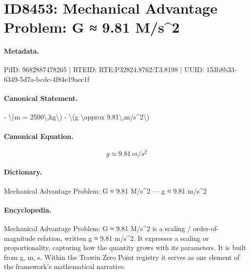 \section*{ID8453: Mechanical Advantage Problem: G ≈ 9.81 M/s\textasciicircum{}2}
\paragraph{Metadata.}
PiID: 9682887478265 | RTEID: RTE:P32824.8762:T3.8198 | UUID: 153b8b33-6349-5d7a-bcdc-4f84e19aec1f

\paragraph{Canonical Statement.}
- \textbackslash{}(m = 2500\textbackslash{},kg\textbackslash{}) - \textbackslash{}(g \textbackslash{}approx 9.81\textbackslash{},m/s\textasciicircum{}2\textbackslash{})

\paragraph{Canonical Equation.}
\[
g \approx 9.81\,m/s^2
\]

\paragraph{Dictionary.}
Mechanical Advantage Problem: G ≈ 9.81 M/s\textasciicircum{}2 — g ≈ 9.81 m/s\textasciicircum{}2

\paragraph{Encyclopedia.}
Mechanical Advantage Problem: G ≈ 9.81 M/s\textasciicircum{}2 is a scaling / order-of-magnitude relation, written g ≈ 9.81 m/s\textasciicircum{}2. It expresses a scaling or proportionality, capturing how the quantity grows with its parameters. It is built from g, m, s. Within the Trawin Zero Point registry it serves as one element of the framework's mathematical narrative.
